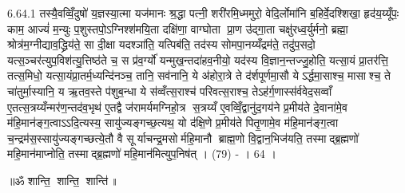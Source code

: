 6.64.1
तस्यै॒वव्विँ॒दुषो॑ य॒ज्ञस्या॒त्मा यज॑मानः श्र॒द्धा पत्नी॒ शरी॑रमि॒ध्ममुरो॒ वेदि॒र्लोमा॑नि ब॒\ar{}हिर्वे॒दश्शिखा॒ हृद॑य॒य्यूँपः॒ काम॒ आज्यं॑ म॒न्युः प॒शुस्तपो॒ऽग्निश्श॑मयि॒ता दक्षि॑णा॒ वाग्घोता प्रा॒ण उ॑द्गा॒ता चक्षु॑रध्व॒र्युर्मनो॒ ब्रह्मा॒ श्रोत्र॑म॒ग्नीद्याव॒द्ध्रिय॑ते॒ सा दी॒क्षा यदश्ञा॑ति॒ यत्पिब॑ति॒ तद॑स्य सोमपा॒नय्यँद्रम॑ते॒ तदु॑प॒सदो॒ यत्स॒ञ्चर॑त्युप॒विश॑त्यु॒त्तिष्ठ॑ते च॒ स प्र॑व॒र्ग्यो॑ यन्मुख॒न्तदा॑हव॒नीयो॒ यद॑स्य वि॒ज्ञान॒न्तज्जु॒होति॒ यत्सा॒यं प्रा॒तर॑त्ति॒ तत्स॒मिधो॒ यत्सा॒यंप्रा॒तर्म॒ध्यन्दि॑नञ्च॒ तानि॒ सव॑नानि॒ ये अ॑होरा॒त्रे ते द॑र्\mbox{}शपूर्णमा॒सौ येऽर्द्धमा॒साश्च॒ मासाश्च॒ ते चा॑तुर्मा॒स्यानि॒ य ऋ॒तव॒स्ते प॑शुब॒न्धा ये स॑व्वँत्स॒राश्च॑ परिवत्स॒राश्च॒ तेऽह॑र्ग॒णास्स॑र्ववेद॒सव्वाँ ए॒तत्स॒त्रय्यँन्मर॑ण॒न्तद॑व॒भृथ॑ ए॒तद्वै ज॑रामर्यमग्निहो॒त्र स॒त्रय्यँ ए॒वव्विँ॒द्वानु॑द॒गय॑ने प्र॒मीय॑ते दे॒वाना॑मे॒व म॑हि॒मान॑ङ्ग॒त्वाऽऽदि॒त्यस्य॒ सायु॑ज्यङ्गच्छ॒त्यथ॒ यो द॑क्षि॒णे प्र॒मीय॑ते पितृ॒णामे॒व म॑हि॒मान॑ङ्ग॒त्वा च॒न्द्रम॑स॒स्सायु॑ज्यङ्गच्छत्ये॒तौ वै सूर्याचन्द्र॒मसोर्महि॒मानौ ब्राह्म॒णो वि॒द्वान॒भिज॑यति॒ तस्माद्ब्र॒ह्मणो॑ महि॒मान॑माप्नोति॒ तस्माद्ब्र॒ह्मणो॑ महि॒मान॑मित्युप॒निष॑त् । (79) - । 64 ।

\centerline{॥ॐ शान्ति॒ शान्ति॒ शान्ति॑॥}
